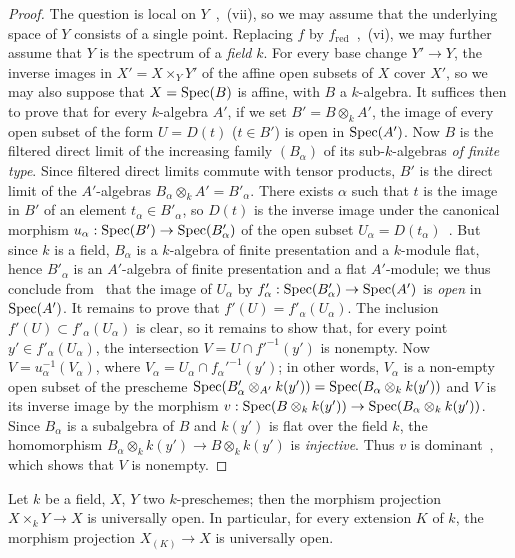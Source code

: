 \begin{proof}
The question is local on $Y$~,~(vii), so we may assume that the underlying space of $Y$ consists of a single point. Replacing $f$ by $f_{\mathrm{red}}$~,~(vi), we may further assume that $Y$ is the spectrum of a \emph{field} $k$. For every base change $Y'\to Y$, the inverse images in $X'=X\times_Y Y'$ of the affine open subsets of $X$ cover $X'$, so we may also suppose that $X=\operatorname{Spec}(B)$ is affine, with $B$ a $k$-algebra.
It suffices then to prove that for every $k$-algebra $A'$, if we set $B'=B\otimes_k A'$, the image of every open subset of the form $U=D(t)$ ($t\in B'$) is open in $\operatorname{Spec}(A')$.
Now $B$ is the filtered direct limit of the increasing family $(B_\alpha)$ of its sub-$k$-algebras \emph{of finite type}. Since filtered direct limits commute with tensor products, $B'$ is the direct limit of the $A'$-algebras $B_\alpha\otimes_k A'=B'_\alpha$.
There exists $\alpha$ such that $t$ is the image in $B'$ of an element $t_\alpha\in B'_\alpha$, so $D(t)$ is the inverse image under the canonical morphism $u_\alpha:\operatorname{Spec}(B')\to\operatorname{Spec}(B'_\alpha)$ of the open subset $U_\alpha=D(t_\alpha)$~.
But since $k$ is a field, $B_\alpha$ is a $k$-algebra of finite presentation and a $k$-module flat, hence $B'_\alpha$ is an $A'$-algebra of finite presentation and a flat $A'$-module; we thus conclude from~ that the image of $U_\alpha$ by $f'_\alpha:\operatorname{Spec}(B'_\alpha)\to\operatorname{Spec}(A')$ is \emph{open} in $\operatorname{Spec}(A')$.
It remains to prove that $f'(U)=f'_\alpha(U_\alpha)$. The inclusion $f'(U)\subset f'_\alpha(U_\alpha)$ is clear, so it remains to show that, for every point $y'\in f'_\alpha(U_\alpha)$, the intersection $V=U\cap f'^{-1}(y')$ is nonempty.
Now $V=u_\alpha^{-1}(V_\alpha)$, where $V_\alpha=U_\alpha\cap f_\alpha'^{-1}(y')$; in other words, $V_\alpha$ is a non-empty open subset of the prescheme $\operatorname{Spec}(B'_\alpha\otimes_{A'}k(y'))=\operatorname{Spec}(B_\alpha\otimes_k k(y'))$ and $V$ is its inverse image by the morphism $v:\operatorname{Spec}(B\otimes_k k(y'))\to\operatorname{Spec}(B_\alpha\otimes_k k(y'))$.
  Since $B_\alpha$ is a subalgebra of $B$ and $k(y')$ is flat over the field
  $k$, the homomorphism
  $B_\alpha\otimes_k k(y')\to B\otimes_k k(y')$ is \emph{injective}.
  Thus $v$ is dominant~, which shows that $V$ is nonempty.
\end{proof}

\begin{corollary}[2.4.10]
\label{IV.2.4.10}
Let $k$ be a field, $X$, $Y$ two $k$-preschemes; then the morphism projection $X\times_k Y\to X$ is universally open.
In particular, for every extension $K$ of $k$, the morphism projection $X_{(K)}\to X$ is universally open.
\end{corollary}

